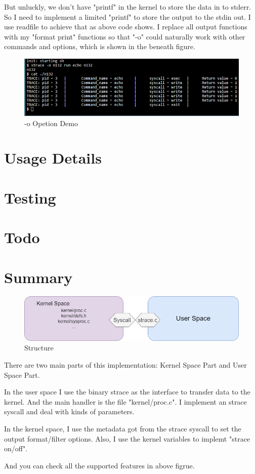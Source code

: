 \documentclass[11pt,oneside,a4paper]{article}
\begin{document}
But unluckly, we don't have "printf" in the kernel to store the data in to stderr.
So I need to implement a limited "printf" to store the output to the stdin out. 
I use readfile to achieve that as above code shows. I replace all output functions
with my "format print" functions so that "-o" could naturally work with other 
commands and options, which is shown in the beneath figure.

\begin{figure}[H]
    \includegraphics[width=4.75in]{1-35.png}
    \centering
    \caption{-o Opetion Demo}
\end{figure}




\section{Usage Details}


\section{Testing}

\section{Todo}

\section{Summary}

\begin{figure}[H]
    \includegraphics[width=4.75in]{1-36.png}
    \centering
    \caption{Structure}
\end{figure}
There are two main parts of this implementation: Kernel Space Part and User Space Part.

In the user space I use the binary strace as the interface to
transfer data to the kernel. And the main handler is the file "kernel/proc.c". I
implement an strace syscall and deal with kinds of parameters. 

In the kernel space, I use the metadata got from the strace syscall to set the
output format/filter options. Also, I use the kernel variables to implemt
"strace on/off".


And you can check all the supported features in above figrue.
\end{document}
